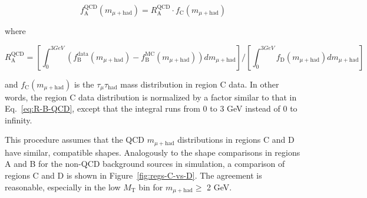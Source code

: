 \begin{equation}
\label{eq:f-A-QCD}
f_{\text{A}}^{\text{QCD}}(m_{\mu+\text{had}}) = R_{\text{A}}^{\text{QCD}}\cdot f_{\text{C}}(m_{\mu+\text{had}})
\end{equation}

where

\begin{equation}
\label{eq:R-A-QCD}
R_{\text{A}}^{\text{QCD}} = [\int_{0}^{3 GeV}(f_{\text{B}}^{\text{data}}(m_{\mu+\text{had}}) - f_{\text{B}}^{\text{MC}}(m_{\mu+\text{had}}))dm_{\mu+\text{had}}]/[\int_{0}^{3 GeV}f_{\text{D}}(m_{\mu+\text{had}})dm_{\mu+\text{had}}]
\end{equation}

and $f_{\text{C}}(m_{\mu+\text{had}})$ is the $\tau_{\mu}\tau_{\text{had}}$ mass distribution in region C data.  In other words, the region C data distribution is normalized by a factor similar to that in Eq.~\ref{eq:R-B-QCD}, except that the integral runs from 0 to 3 GeV instead of 0 to infinity.

This procedure assumes that the QCD $m_{\mu+\text{had}}$ distributions in regions C and D have similar, compatible shapes. Analogously to the shape comparisons in regions A and B for the non-QCD background sources in simulation, a comparison of regions C and D is shown in Figure~\ref{fig:regs-C-vs-D}.  The agreement is reasonable, especially in the low $M_{\text{T}}$ bin for $m_{\mu+\text{had}} \geq$ 2 GeV.

